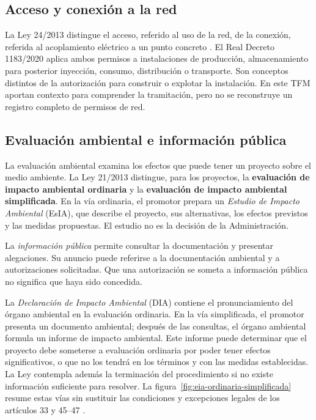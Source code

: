 \subsection{Acceso y conexión a la red}
La Ley 24/2013 distingue el acceso, referido al uso de la red, de la conexión,
referida al acoplamiento eléctrico a un punto concreto
\cite{jefaturadelestado_ley242013_2013}. El Real Decreto 1183/2020
\cite{ministeriotransicionecologica_realdecreto1183_2020} aplica ambos permisos
a instalaciones de producción, almacenamiento para posterior inyección,
consumo, distribución o transporte.
Son conceptos distintos de la autorización para construir o explotar la
instalación.
En este TFM aportan contexto para comprender la tramitación, pero no se
reconstruye un registro completo de permisos de red.

\subsection{Evaluación ambiental e información pública}
La evaluación ambiental examina los efectos que puede tener un proyecto
sobre el medio ambiente. La Ley 21/2013 distingue, para los proyectos, la
\textbf{evaluación de impacto ambiental ordinaria} y la
\textbf{evaluación de impacto ambiental simplificada}. En la vía ordinaria,
el promotor prepara un \emph{Estudio de Impacto Ambiental} (EsIA), que describe
el proyecto, sus alternativas, los efectos previstos y las medidas propuestas.
El estudio no es la decisión de la Administración.

La \emph{información pública} permite consultar la documentación y presentar
alegaciones. Su anuncio puede referirse a la documentación ambiental y a
autorizaciones solicitadas. Que una autorización se someta a información
pública no significa que haya sido concedida.

La \emph{Declaración de Impacto Ambiental} (DIA) contiene el pronunciamiento
del órgano ambiental en la evaluación ordinaria. En la vía simplificada, el
promotor presenta un documento ambiental; después de las consultas, el órgano
ambiental formula un informe de impacto ambiental. Este informe puede
determinar que el proyecto debe someterse a evaluación ordinaria por poder
tener efectos significativos, o que no los tendrá en los términos y con las
medidas establecidas. La Ley contempla además la terminación del procedimiento
si no existe información suficiente para resolver. La
figura~\ref{fig:eia-ordinaria-simplificada} resume estas vías sin sustituir las
condiciones y excepciones legales de los artículos 33 y 45--47
\cite{jefaturadelestado_ley212013_2013}.

